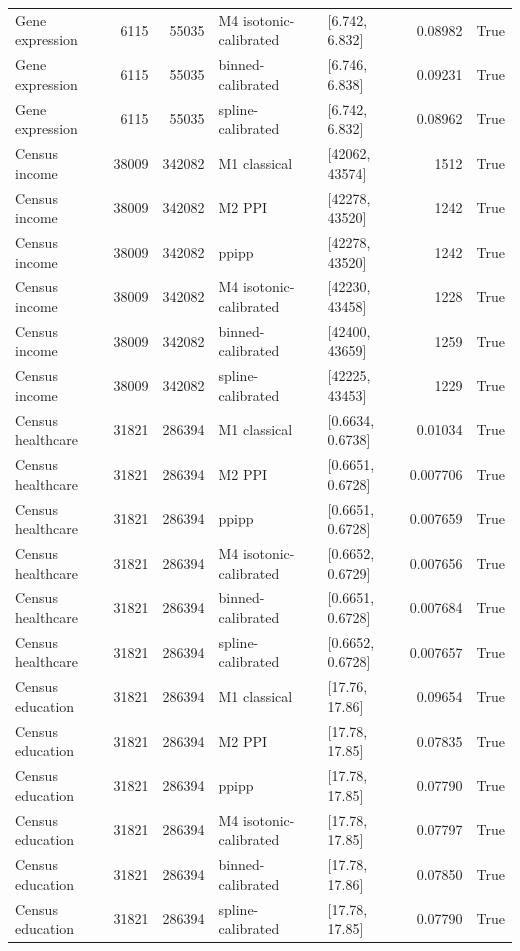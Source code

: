 \begin{tabular}{lrrllrl}
Gene expression & 6115 & 55035 & M4 isotonic-calibrated & [6.742, 6.832] & 0.08982 & True \\
Gene expression & 6115 & 55035 & binned-calibrated & [6.746, 6.838] & 0.09231 & True \\
Gene expression & 6115 & 55035 & spline-calibrated & [6.742, 6.832] & 0.08962 & True \\
Census income & 38009 & 342082 & M1 classical & [42062, 43574] & 1512 & True \\
Census income & 38009 & 342082 & M2 PPI & [42278, 43520] & 1242 & True \\
Census income & 38009 & 342082 & ppipp & [42278, 43520] & 1242 & True \\
Census income & 38009 & 342082 & M4 isotonic-calibrated & [42230, 43458] & 1228 & True \\
Census income & 38009 & 342082 & binned-calibrated & [42400, 43659] & 1259 & True \\
Census income & 38009 & 342082 & spline-calibrated & [42225, 43453] & 1229 & True \\
Census healthcare & 31821 & 286394 & M1 classical & [0.6634, 0.6738] & 0.01034 & True \\
Census healthcare & 31821 & 286394 & M2 PPI & [0.6651, 0.6728] & 0.007706 & True \\
Census healthcare & 31821 & 286394 & ppipp & [0.6651, 0.6728] & 0.007659 & True \\
Census healthcare & 31821 & 286394 & M4 isotonic-calibrated & [0.6652, 0.6729] & 0.007656 & True \\
Census healthcare & 31821 & 286394 & binned-calibrated & [0.6651, 0.6728] & 0.007684 & True \\
Census healthcare & 31821 & 286394 & spline-calibrated & [0.6652, 0.6728] & 0.007657 & True \\
Census education & 31821 & 286394 & M1 classical & [17.76, 17.86] & 0.09654 & True \\
Census education & 31821 & 286394 & M2 PPI & [17.78, 17.85] & 0.07835 & True \\
Census education & 31821 & 286394 & ppipp & [17.78, 17.85] & 0.07790 & True \\
Census education & 31821 & 286394 & M4 isotonic-calibrated & [17.78, 17.85] & 0.07797 & True \\
Census education & 31821 & 286394 & binned-calibrated & [17.78, 17.86] & 0.07850 & True \\
Census education & 31821 & 286394 & spline-calibrated & [17.78, 17.85] & 0.07790 & True \\

\end{tabular}
